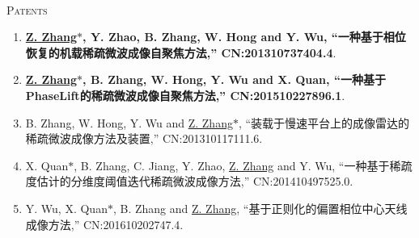 \documentclass[paper=a4,fontsize=11pt]{scrartcl}
\begin{document}
~\\
\textsc{Patents}

\begin{enumerate}

\item \textbf{\underline{Z. Zhang$\ast$}, Y. Zhao, B. Zhang, W. Hong and Y. Wu, ``一种基于相位恢复的机载稀疏微波成像自聚焦方法,'' CN:201310737404.4}.

\item \textbf{\underline{Z. Zhang$\ast$}, B. Zhang, W. Hong, Y. Wu and X. Quan, ``一种基于PhaseLift的稀疏微波成像自聚焦方法,'' CN:201510227896.1}.

\item B. Zhang, W. Hong, Y. Wu and \underline{Z. Zhang$\ast$}, ``装载于慢速平台上的成像雷达的稀疏微波成像方法及装置,'' CN:201310117111.6.

\item X. Quan$\ast$, B. Zhang, C. Jiang, Y. Zhao, \underline{Z. Zhang} and Y. Wu, ``一种基于稀疏度估计的分维度阈值迭代稀疏微波成像方法,'' CN:201410497525.0.

\item Y. Wu, X. Quan$\ast$, B. Zhang and \underline{Z. Zhang}, ``基于正则化的偏置相位中心天线成像方法,'' CN:201610202747.4.

\end{enumerate}
\end{document}
